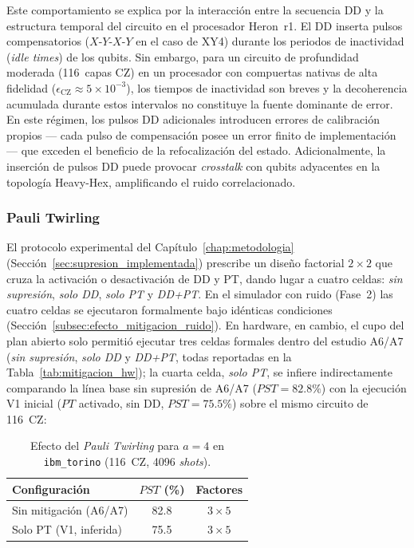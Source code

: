 \documentclass[12pt, spanish]{book}
\begin{document}
Este comportamiento se explica por la interacción entre la secuencia DD y la estructura temporal del circuito en el procesador Heron~r1. El DD inserta pulsos compensatorios ($X$-$Y$-$X$-$Y$ en el caso de XY4) durante los periodos de inactividad (\textit{idle times}) de los qubits. Sin embargo, para un circuito de profundidad moderada (116~capas CZ) en un procesador con compuertas nativas de alta fidelidad ($\epsilon_{\text{CZ}} \approx 5 \times 10^{-3}$), los tiempos de inactividad son breves y la decoherencia acumulada durante estos intervalos no constituye la fuente dominante de error. En este régimen, los pulsos DD adicionales introducen errores de calibración propios --- cada pulso de compensación posee un error finito de implementación --- que exceden el beneficio de la refocalización del estado. Adicionalmente, la inserción de pulsos DD puede provocar \textit{crosstalk} con qubits adyacentes en la topología Heavy-Hex, amplificando el ruido correlacionado.

\subsubsection{Pauli Twirling}

El protocolo experimental del Capítulo~\ref{chap:metodologia} (Sección~\ref{sec:supresion_implementada}) prescribe un diseño factorial $2 \times 2$ que cruza la activación o desactivación de DD y PT, dando lugar a cuatro celdas: \emph{sin supresión}, \emph{solo DD}, \emph{solo PT} y \emph{DD+PT}. En el simulador con ruido (Fase~2) las cuatro celdas se ejecutaron formalmente bajo idénticas condiciones (Sección~\ref{subsec:efecto_mitigacion_ruido}). En hardware, en cambio, el cupo del plan abierto solo permitió ejecutar tres celdas formales dentro del estudio A6/A7 (\emph{sin supresión}, \emph{solo DD} y \emph{DD+PT}, todas reportadas en la Tabla~\ref{tab:mitigacion_hw}); la cuarta celda, \emph{solo PT}, se infiere indirectamente comparando la línea base sin supresión de A6/A7 ($PST = 82.8\%$) con la ejecución V1 inicial ($PT$ activado, sin DD, $PST = 75.5\%$) sobre el mismo circuito de 116~CZ:

\begin{table}[H]
    \centering
    \caption{Efecto del \textit{Pauli Twirling} para $a = 4$ en \texttt{ibm\_torino} (116~CZ, 4096 \textit{shots}).\\}
    \label{tab:pt_effect}
    \begin{tabular}{lcc}
        \hline
        Configuración          & $PST$ (\%) & Factores     \\
        \hline
        Sin mitigación (A6/A7) & 82.8       & $3 \times 5$ \\
        Solo PT (V1, inferida) & 75.5       & $3 \times 5$ \\
        \hline
    \end{tabular}
\end{table}
\end{document}
